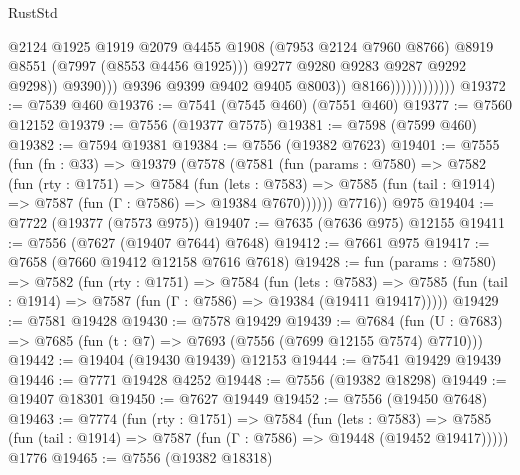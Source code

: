 \begin{lexlean}{RustStd}
\begin{coremodule}
                                            @2124
                                            @1925
                                            @1919
                                            @2079
                                            @4455
                                            @1908
                                            (@7953 @2124 @7960 @8766)
                                            @8919
                                            @8551
                                            (@7997 (@8553 @4456 @1925)))
                                          @9277
                                          @9280
                                          @9283
                                          @9287
                                          @9292
                                          @9298))
                                      @9390)))
                                @9396
                                @9399
                                @9402
                                @9405
                                @8003))
                            @8166))))))))))))
@19372 := @7539 @460
@19376 := @7541 (@7545 @460) (@7551 @460)
@19377 := @7560 @12152
@19379 := @7556 (@19377 @7575)
@19381 := @7598 (@7599 @460)
@19382 := @7594 @19381
@19384 := @7556 (@19382 @7623)
@19401 := @7555
    (fun (fn : @33) =>
    @19379
      (@7578
        (@7581
          (fun (params : @7580) =>
          @7582
            (fun (rty : @1751) =>
            @7584
              (fun (lets : @7583) =>
              @7585 (fun (tail : @1914) => @7587 (fun (Γ : @7586) => @19384 @7670))))))
        @7716))
    @975
@19404 := @7722 (@19377 (@7573 @975))
@19407 := @7635 (@7636 @975) @12155
@19411 := @7556 (@7627 (@19407 @7644) @7648)
@19412 := @7661 @975
@19417 := @7658 (@7660 @19412 @12158 @7616 @7618)
@19428 := fun (params : @7580) =>
  @7582
    (fun (rty : @1751) =>
    @7584
      (fun (lets : @7583) =>
      @7585 (fun (tail : @1914) => @7587 (fun (Γ : @7586) => @19384 (@19411 @19417)))))
@19429 := @7581 @19428
@19430 := @7578 @19429
@19439 := @7684
    (fun (U : @7683) => @7685 (fun (t : @7) => @7693 (@7556 (@7699 @12155 @7574) @7710)))
@19442 := @19404 (@19430 @19439) @12153
@19444 := @7541 @19429 @19439
@19446 := @7771 @19428 @4252
@19448 := @7556 (@19382 @18298)
@19449 := @19407 @18301
@19450 := @7627 @19449
@19452 := @7556 (@19450 @7648)
@19463 := @7774
    (fun (rty : @1751) =>
    @7584
      (fun (lets : @7583) =>
      @7585 (fun (tail : @1914) => @7587 (fun (Γ : @7586) => @19448 (@19452 @19417)))))
    @1776
@19465 := @7556 (@19382 @18318)

\end{coremodule}
\end{lexlean}
